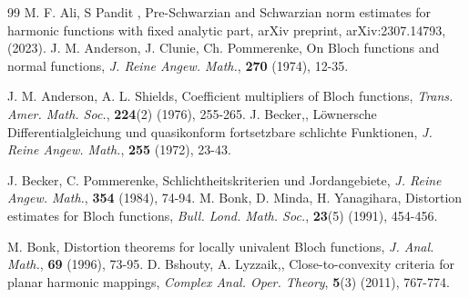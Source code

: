 \documentclass[a4paper,12pt]{amsart}
\theoremstyle{definition}
\begin{document}
	
	\vspace{10mm}
	\begin{thebibliography}{99}
%		
%		
%		
%		
%		
		{\sc M. F. Ali, S Pandit }, Pre-Schwarzian and Schwarzian norm estimates for harmonic functions with fixed analytic part, arXiv preprint, arXiv:2307.14793, (2023).
%		
%		
		{\sc J. M. Anderson, J. Clunie, Ch. Pommerenke}, On {B}loch functions and normal functions, {\it J. Reine Angew. Math.}, {\bf 270} (1974), 12-35.
		
%		
		{\sc J. M. Anderson, A. L. Shields}, Coefficient multipliers of {B}loch functions, {\it Trans. Amer. Math. Soc.}, {\bf 224}(2) (1976), 255-265.
%		
%		
%		
%		
%		
%		
		{\sc J. Becker,}, L{\"o}wnersche Differentialgleichung und quasikonform fortsetzbare schlichte Funktionen, {\it J. Reine Angew. Math.}, {\bf 255} (1972), 23-43.
		
		{\sc J. Becker, C. Pommerenke}, Schlichtheitskriterien und Jordangebiete, {\it J. Reine Angew. Math.}, {\bf 354} (1984), 74-94.
%		
%		
%		
		{\sc M. Bonk, D. Minda, H. Yanagihara}, Distortion estimates for {B}loch functions, {\it Bull. Lond. Math. Soc.}, {\bf 23}(5) (1991), 454-456.
		
		{\sc M. Bonk}, Distortion theorems for locally univalent {B}loch functions, {\it J. Anal. Math.}, {\bf 69} (1996), 73-95.
%		
%		
%		
%		
%		
%		
%		
		{\sc D. Bshouty, A. Lyzzaik,},  Close-to-convexity criteria for planar harmonic mappings,    {\it Complex Anal. Oper. Theory}, {\bf 5}(3) (2011), 767-774.
%		
%		


\end{thebibliography}
\end{document}
